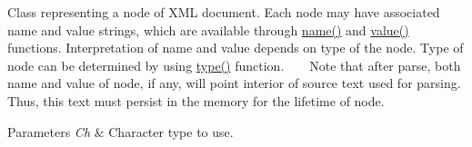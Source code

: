 Class representing a node of X\+M\+L document. Each node may have associated name and value strings, which are available through \hyperlink{classrapidxml_1_1xml__base_a9a09739310469995db078ebd0da3ed45}{name()} and \hyperlink{classrapidxml_1_1xml__base_adcdaccff61c665f039d9344e447b7445}{value()} functions. Interpretation of name and value depends on type of the node. Type of node can be determined by using \hyperlink{singletonrapidxml_1_1xml__node_a2c6a4315b98bcfa2e04fed3fa1b22c36}{type()} function. ~\newline
~\newline
 Note that after parse, both name and value of node, if any, will point interior of source text used for parsing. Thus, this text must persist in the memory for the lifetime of node. 
\begin{DoxyParams}{Parameters}
{\em Ch} & Character type to use. \\
\hline
\end{DoxyParams}


